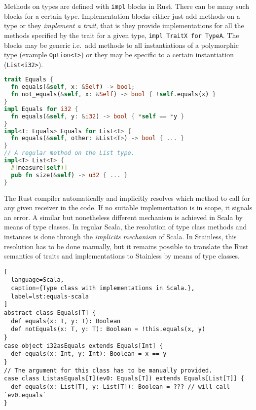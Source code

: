 Methods on types are defined with \passthrough{\lstinline!impl!} blocks
in Rust. There can be many such blocks for a certain type.
Implementation blocks either just add methods on a type or they
\emph{implement a trait}, that is they provide implementations for all
the methods specified by the trait for a given type,
\passthrough{\lstinline!impl TraitX for TypeA!}. The blocks may be
generic i.e.~add methods to all instantiations of a polymorphic type
(example \passthrough{\lstinline!Option<T>!}) or they may be specific to
a certain instantiation (\passthrough{\lstinline!List<i32>!}).

\begin{lstlisting}[language=Rust, caption={Rust trait with two implementations.}]
trait Equals {
  fn equals(&self, x: &Self) -> bool;
  fn not_equals(&self, x: &Self) -> bool { !self.equals(x) }
}
impl Equals for i32 {
  fn equals(&self, y: &i32) -> bool { *self == *y }
}
impl<T: Equals> Equals for List<T> {
  fn equals(&self, other: &List<T>) -> bool { ... }
}
// A regular method on the List type.
impl<T> List<T> {
  #[measure(self)]
  pub fn size(&self) -> u32 { ... }
}
\end{lstlisting}

The Rust compiler automatically and implicitly resolves which method to
call for any given receiver in the code. If no suitable implementation
is in scope, it signals an error. A similar but nonetheless different
mechanism is achieved in Scala by means of type classes. In regular
Scala, the resolution of type class methods and instances is done
through the \emph{implicits mechanism} of Scala. In Stainless, this
resolution has to be done manually, but it remains possible to translate
the Rust semantics of traits and implementations to Stainless by means
of type classes.

\begin{lstlisting}[
  language=Scala,
  caption={Type class with implementations in Scala.},
  label=lst:equals-scala
]
abstract class Equals[T] {
  def equals(x: T, y: T): Boolean
  def notEquals(x: T, y: T): Boolean = !this.equals(x, y)
}
case object i32asEquals extends Equals[Int] {
  def equals(x: Int, y: Int): Boolean = x == y
}
// The argument for this class has to be manually provided.
case class ListasEquals[T](ev0: Equals[T]) extends Equals[List[T]] {
  def equals(x: List[T], y: List[T]): Boolean = ??? // will call `ev0.equals`
}
\end{lstlisting}

